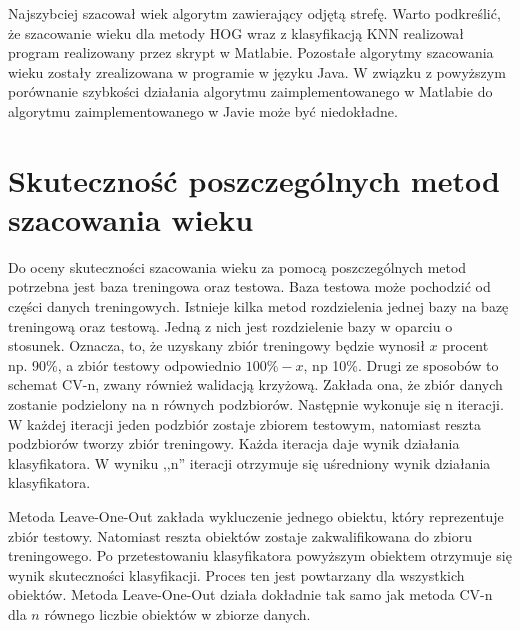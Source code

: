 \documentclass[a4paper,twoside,12pt]{book}
\begin{document}
    Najszybciej szacował wiek algorytm zawierający odjętą strefę.
    Warto podkreślić, że szacowanie wieku dla metody HOG wraz z klasyfikacją KNN realizował
    program realizowany przez skrypt w Matlabie.
    Pozostałe algorytmy szacowania wieku zostały zrealizowana w programie w języku Java.
    W związku z powyższym porównanie szybkości działania
    algorytmu zaimplementowanego w Matlabie do algorytmu zaimplementowanego w Javie może być niedokładne.



    \section{Skuteczność poszczególnych metod szacowania wieku}\label{sec:skuteczność-poszczególnych-metod-szacowania-wieku}
    Do oceny skuteczności szacowania wieku za pomocą poszczególnych metod potrzebna jest baza treningowa oraz testowa.
    Baza testowa może pochodzić od części danych treningowych. Istnieje kilka metod rozdzielenia jednej bazy na bazę
    treningową oraz testową.
    Jedną z nich jest rozdzielenie bazy w oparciu o stosunek. Oznacza, to, że uzyskany zbiór treningowy będzie wynosił
    $x$ procent np. 90\%, a zbiór testowy odpowiednio $100\% -x$, np 10\%.\cite{schematTreningu}
    Drugi ze sposobów to schemat CV-n, zwany również walidacją krzyżową.
    Zakłada ona, że zbiór danych zostanie podzielony na n równych podzbiorów.
    Następnie wykonuje się n iteracji. W każdej iteracji jeden podzbiór zostaje zbiorem testowym, natomiast reszta
    podzbiorów tworzy zbiór treningowy.
    Każda iteracja daje wynik działania klasyfikatora. W wyniku ,,n'' iteracji otrzymuje się uśredniony wynik
    działania klasyfikatora.\cite{schematTreningu}

    Metoda Leave-One-Out zakłada wykluczenie jednego obiektu, który reprezentuje zbiór testowy. Natomiast reszta obiektów zostaje zakwalifikowana do zbioru treningowego.
    Po przetestowaniu klasyfikatora powyższym obiektem otrzymuje się wynik skuteczności klasyfikacji. Proces ten jest powtarzany dla wszystkich obiektów.
    Metoda Leave-One-Out działa dokładnie tak samo jak metoda CV-n dla $n$ równego liczbie obiektów
    w zbiorze danych.\cite{schematTreningu}
\end{document}
